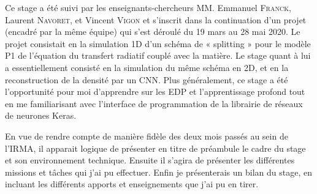 Ce stage a été suivi par les enseignants-chercheurs MM. Emmanuel \textsc{Franck}, Laurent \textsc{Navoret}, et Vincent \textsc{Vigon} et s'inscrit dans la continuation d'un projet (encadré par la même équipe) qui s'est déroulé du 19 mars au 28 mai 2020. Le projet consistait en la simulation 1D d'un schéma de « splitting » pour le modèle P1 de l'équation du transfert radiatif couplé avec la matière. Le stage quant à lui a essentiellement consisté en la simulation du même schéma en 2D, et en la reconstruction de la densité par un CNN. Plus généralement, ce stage a été l'opportunité pour moi d'apprendre sur les EDP et l'apprentissage profond tout en me familiarisant avec l'interface de programmation de la librairie de réseaux de neurones Keras. 

En vue de rendre compte de manière fidèle des deux mois passés au sein de l'IRMA, il apparait logique de présenter en titre de préambule le cadre du stage et son environnement technique. Ensuite il s'agira de présenter les différentes missions et tâches qui j'ai pu effectuer. Enfin je présenterais un bilan du stage, en incluant les différents apports et enseignements que j'ai pu en tirer.

